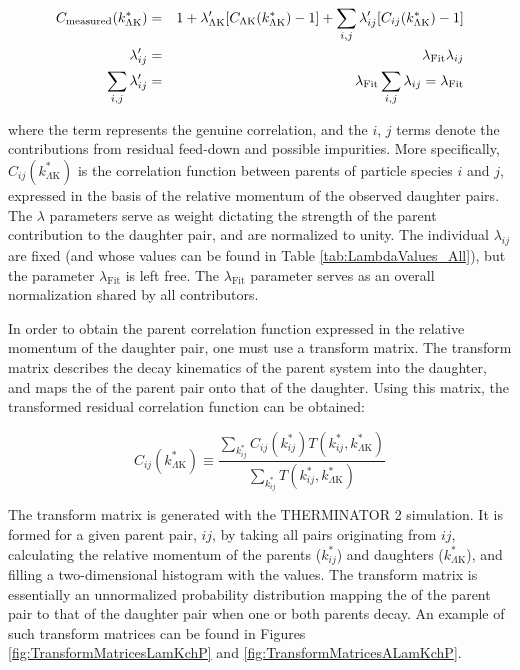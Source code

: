 \documentclass[/home/jesse/Analysis/FemtoAnalysis/AnalysisNotes/AnalysisNoteJBuxton.tex]{subfiles}
\begin{document}
\begin{eqnarray}
\label{eqn:Residuals} 
 C_{\mathrm{measured}}(k^{*}_{\Lambda\mathrm{K}}) &=& 1 + \lambda'_{\Lambda\mathrm{K}}[C_{\Lambda\mathrm{K}}(k^{*}_{\Lambda\mathrm{K}}) - 1] + \sum\limits_{i,j}  \lambda'_{ij}[C_{ij}(k^{*}_{\Lambda\mathrm{K}})-1] \\
 \lambda_{ij}' &=& \lambda_{\mathrm{Fit}}\lambda_{ij} \notag \\
 \sum\limits_{i,j}\lambda_{ij}' &=&  \lambda_{\mathrm{Fit}}\sum\limits_{i,j}\lambda_{ij} = \lambda_{\mathrm{Fit}} \notag
\label{eqn:CfwRes} 
\end{eqnarray}

where the \LamK term represents the genuine \LamK correlation, and the $i$, $j$ terms denote the contributions from residual feed-down and possible impurities.
More specifically, $C_{ij}(k^{*}_{\Lambda\mathrm{K}})$ is the correlation function between parents of particle species $i$ and $j$, expressed in the basis of the relative momentum of the observed daughter \LamK pairs.  
The $\lambda$ parameters serve as weight dictating the strength of the parent contribution to the daughter pair, and are normalized to unity.
The individual $\lambda_{ij}$ are fixed (and whose values can be found in Table \ref{tab:LambdaValues_All}), but the parameter $\lambda_{\mathrm{Fit}}$ is left free.
The $\lambda_{\mathrm{Fit}}$ parameter serves as an overall normalization shared by all contributors.

In order to obtain the parent correlation function expressed in the relative momentum of the daughter pair, one must use a transform matrix.
The transform matrix describes the decay kinematics of the parent system into the daughter, and maps the \kstar of the parent pair onto that of the daughter.
Using this matrix, the transformed residual correlation function can be obtained:


\begin{equation}
  C_{ij}(k^{*}_{\Lambda\mathrm{K}}) \equiv \frac{\sum\limits_{k^{*}_{ij}} C_{ij}\left(k^{*}_{ij}\right) T\left(k^{*}_{ij},k^{*}_{\Lambda\mathrm{K}}\right)}{\sum\limits_{k^{*}_{ij}} T\left(k^{*}_{ij},k^{*}_{\Lambda\mathrm{K}}\right)}
\label{eqn:ResidualsTransform}
\end{equation}


The transform matrix is generated with the THERMINATOR 2 \cite{Chojnacki:2011hb} simulation. 
It is formed for a given parent pair, $ij$, by taking all \LamK pairs originating from $ij$, calculating the relative momentum of the parents ($k^{*}_{ij}$) and daughters ($k^{*}_{\Lambda\mathrm{K}}$), and filling a two-dimensional histogram with the values. 
The transform matrix is essentially an unnormalized probability distribution mapping the \kstar of the parent pair to that of the daughter pair when one or both parents decay.
An example of such transform matrices can be found in Figures \ref{fig:TransformMatricesLamKchP} and \ref{fig:TransformMatricesALamKchP}.
\end{document}
